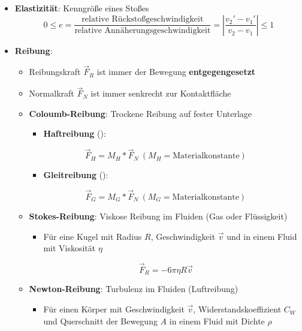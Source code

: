 \begin{itemize}
	\item \textbf{Elastizität}: Kenngröße eines Stoßes
	\begin{equation}
		0 \leq e = \frac{\text{relative Rückstoßgeschwindigkeit}}{\text{relative Annäherungsgeschwindigkeit}} = |\frac{v_2' - v_1'}{v_2 - v_1}| \leq 1
	\end{equation}
	\newpage
	\item \textbf{Reibung}:
	\begin{itemize}
		\item Reibungskraft $\vec{F}_R$ ist immer der Bewegung \textbf{entgegengesetzt}
		\item Normalkraft $\vec{F}_N$ ist immer senkrecht zur Kontaktfläche
		\item \textbf{Coloumb-Reibung}: Trockene Reibung auf fester Unterlage
		\begin{itemize}
			\item \textbf{Haftreibung} ():
		\end{itemize}
		\begin{equation}
			\vec{F}_H = M_H * \vec{F}_N\ (M_H = \text{Materialkonstante})
		\end{equation}
		\begin{itemize}
			\item \textbf{Gleitreibung} ():
		\end{itemize}
		\begin{equation}
			\vec{F}_G = M_G * \vec{F}_N\ (M_G = \text{Materialkonstante})
		\end{equation}
		\item \textbf{Stokes-Reibung}: Viskose Reibung im Fluiden (Gas oder Flüssigkeit)
		\begin{itemize}
			\item Für eine Kugel mit Radius $R$, Geschwindigkeit $\vec{v}$ und in einem Fluid mit Viskosität $\eta$
		\end{itemize}
		\begin{equation}
			\vec{F}_R = -6\pi\eta R\vec{v}
		\end{equation}
		\item \textbf{Newton-Reibung}: Turbulenz im Fluiden (Luftreibung)
		\begin{itemize}
			\item Für einen Körper mit Geschwindigkeit $\vec{v}$, Widerstandskoeffizient $C_W$ und Querschnitt der Bewegung $A$ in einem Fluid mit Dichte $\rho$
		\end{itemize}
		\begin{equation}

\end{equation}
\end{itemize}
\end{itemize}
